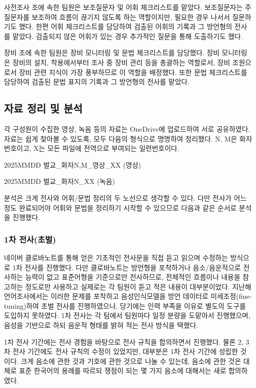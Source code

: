사전조사 조에 속한 팀원은 보조질문자 및 어휘 체크리스트를 맡았다. 보조질문자는 주질문자를 보조하여 흐름이 끊기지 않도록 하는 역할이지만, 필요한 경우 나서서 질문하기도 했다. 한편 어휘 체크리스트를 담당하여 검출된 어휘의 기록과 그 방언형의 전사를 맡았다. 검출되지 않은 어휘가 있는 경우 추가적인 질문을 통해 도출하기도 했다.

장비 조에 속한 팀원은 장비 모니터링 및 문법 체크리스트를 담당했다. 장비 모니터링은 장비의 설치, 착용에서부터 조사 중 장비 관리 등을 총괄하는 역할로서, 장비 조원으로서 장비 관련 지식이 가장 풍부하므로 이 역할을 배정했다. 또한 문법 체크리스트를 담당하여 검출된 문법 표지의 기록과 그 방언형의 전사를 맡았다.

\subsection{자료 정리 및 분석}

각 구성원이 수집한 영상, 녹음 등의 자료는 OneDrive에 업로드하여 서로 공유하였다. 자료는 쉽게 찾아볼 수 있도록, 모두 다음의 형식으로 명명하여 정리했다. N, M은 화자 번호이고, X는 모든 파일에 전역으로 부여되는 일련번호이다.

2025MMDD 벌교\_화자N,M\_영상\_XX (영상)

2025MMDD 벌교\_화자N\_XX (녹음)

분석은 크게 전사와 어휘/문법 정리의 두 노선으로 생각할 수 있다. 다만 전사가 어느 정도 완료되어야 어휘와 문법을 정리하기 시작할 수 있으므로 다음과 같은 순서로 분석을 진행했다.


\subsubsection{1차 전사(초벌)}

네이버 클로바노트를 통해 얻은 기초적인 전사문을 직접 듣고 읽으며 수정하는 방식으로 1차 전사를 진행했다. 다만 클로바노트는 방언형을 포착하거나 음소/음운적으로 전사하는 능력이 없고 표준어형을 기준으로만 전사하므로, 전체적인 흐름이나 내용을 참고하는 정도로만 사용하고 실제로는 각 팀원이 듣고 적은 내용이 대부분이었다. 지난해 언어조사에서는 이러한 문제를 포착하고 음성인식모델을 방언 데이터로 미세조정(fine-tuning)하여 초벌 전사를 진행하였으나, 당기에는 인력 부족을 이유로 별도의 도구를 도입하지 못하였다. 1차 전사는 각 팀에서 팀원마다 일정 분량을 도맡아서 진행했으며, 음성을 기반으로 하되 음운적 형태를 밝혀 적는 전사 방식을 택했다.

1차 전사 기간에는 전사 경험을 바탕으로 전사 규칙을 합의하면서 진행했다. 물론 2, 3차 전사 기간에도 전사 규칙의 수정이 있었지만, 대부분은 1차 전사 기간에 성립한 것이다. 크게 음소에 관한 것과 기호에 관한 것으로 나눌 수 있는데, 음소에 관한 것은 대체로 표준 한국어의 용례를 따르되 쟁점이 되는 몇 가지 음소에 대해서는 새로 합의하였다.

